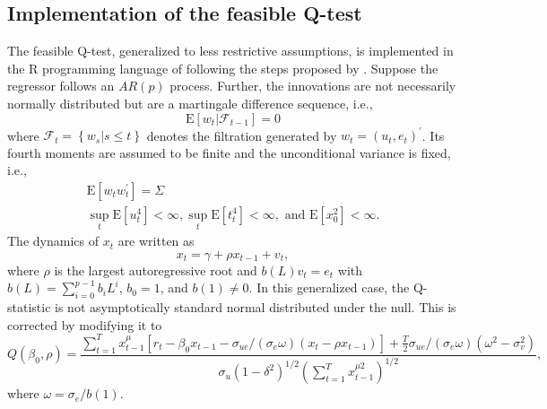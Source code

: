 \documentclass{article}
\begin{document}
\subsection{Implementation of the feasible Q-test}
\label{implementation}

The feasible Q-test, generalized to less restrictive assumptions, is implemented in the R programming language of \citet{R} following the steps proposed by \citet{campbell2005implementing}. Suppose the regressor follows an $AR(p)$ process. Further, the innovations are not necessarily normally distributed but are a martingale difference sequence, i.e., 
\begin{equation}
\mathrm{E}\left[w_{t} |\mathscr{F}_{t-1}\right]=0
\end{equation}
where $\mathscr{F}_{t}=\left\{w_{s} | s \leq t\right\}$ denotes the filtration generated by $w_{t}=\left(u_{t}, e_{t}\right)^{\prime}$.
Its fourth moments are assumed to be finite and the unconditional variance is fixed, i.e.,
\begin{equation}
\label{eqn:covarst}
\begin{array}{l}{\mathrm{E}\left[w_{t} w_{t}^{\prime}\right]=\Sigma} \\ {\sup _{t} \mathrm{E}\left[u_{t}^{4}\right]<\infty, \sup _{t} \mathrm{E}\left[t_{t}^{4}\right]<\infty, \text { and } \mathrm{E}\left[x_{0}^{2}\right]<\infty.}\end{array}
\end{equation}
The dynamics of $x_{t}$ are written as
\begin{equation}
\label{eqn:22}
x_{t}=\gamma+\rho x_{t-1}+v_{t},
\end{equation}
where $\rho$ is the largest autoregressive root and $b(L) v_{t}=e_{t}$ with $b(L)=\sum_{i=0}^{p-1} b_{i} L^{i}$, $b_{0}=1$, and $b(1) \neq 0$. In this generalized case, the Q-statistic is not asymptotically standard normal distributed under the null. This is corrected by modifying it to
\begin{equation}
Q\left(\beta_{0}, \rho\right)=\frac{\sum_{t=1}^{T} x_{t-1}^{\mu}\left[r_{t}-\beta_{0} x_{t-1}-\sigma_{u e} /\left(\sigma_{e} \omega\right)\left(x_{t}-\rho x_{t-1}\right)\right]+\frac{T}{2} \sigma_{u e} /\left(\sigma_{e} \omega\right)\left(\omega^{2}-\sigma_{v}^{2}\right)}{\sigma_{u}\left(1-\delta^{2}\right)^{1 / 2}\left(\sum_{t=1}^{T} x_{t-1}^{\mu 2}\right)^{1 / 2}},
\end{equation}
where $\omega=\sigma_{e} / b(1)$.
\end{document}
